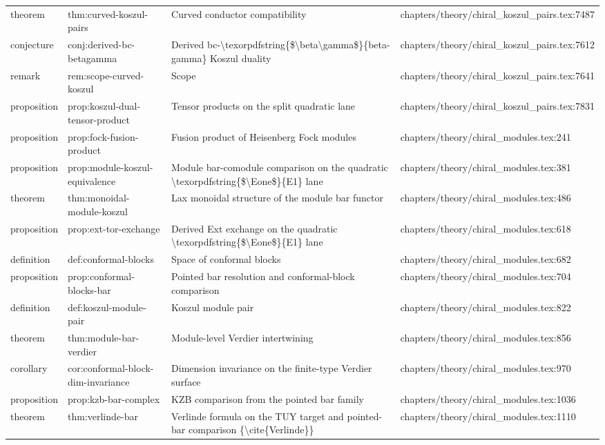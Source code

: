 \documentclass[11pt]{article}
\begin{document}
\begin{longtable}{L{0.10\textwidth}L{0.26\textwidth}L{0.42\textwidth}L{0.22\textwidth}}
theorem & thm:curved-koszul-pairs & Curved conductor compatibility & chapters/theory/chiral\_koszul\_pairs.tex:7487\\
conjecture & conj:derived-bc-betagamma & Derived bc-\textbackslash{}texorpdfstring\{\$\textbackslash{}beta\textbackslash{}gamma\$\}\{beta-gamma\} Koszul duality & chapters/theory/chiral\_koszul\_pairs.tex:7612\\
remark & rem:scope-curved-koszul & Scope & chapters/theory/chiral\_koszul\_pairs.tex:7641\\
proposition & prop:koszul-dual-tensor-product & Tensor products on the split quadratic lane & chapters/theory/chiral\_koszul\_pairs.tex:7831\\
proposition & prop:fock-fusion-product & Fusion product of Heisenberg Fock modules & chapters/theory/chiral\_modules.tex:241\\
proposition & prop:module-koszul-equivalence & Module bar-comodule comparison on the quadratic \textbackslash{}texorpdfstring\{\$\textbackslash{}Eone\$\}\{E1\} lane & chapters/theory/chiral\_modules.tex:381\\
theorem & thm:monoidal-module-koszul & Lax monoidal structure of the module bar functor & chapters/theory/chiral\_modules.tex:486\\
proposition & prop:ext-tor-exchange & Derived Ext exchange on the quadratic \textbackslash{}texorpdfstring\{\$\textbackslash{}Eone\$\}\{E1\} lane & chapters/theory/chiral\_modules.tex:618\\
definition & def:conformal-blocks & Space of conformal blocks & chapters/theory/chiral\_modules.tex:682\\
proposition & prop:conformal-blocks-bar & Pointed bar resolution and conformal-block comparison & chapters/theory/chiral\_modules.tex:704\\
definition & def:koszul-module-pair & Koszul module pair & chapters/theory/chiral\_modules.tex:822\\
theorem & thm:module-bar-verdier & Module-level Verdier intertwining & chapters/theory/chiral\_modules.tex:856\\
corollary & cor:conformal-block-dim-invariance & Dimension invariance on the finite-type Verdier surface & chapters/theory/chiral\_modules.tex:970\\
proposition & prop:kzb-bar-complex & KZB comparison from the pointed bar family & chapters/theory/chiral\_modules.tex:1036\\
theorem & thm:verlinde-bar & Verlinde formula on the TUY target and pointed-bar comparison \{\textbackslash{}cite\{Verlinde\}\} & chapters/theory/chiral\_modules.tex:1110\\

\end{longtable}
\end{document}
